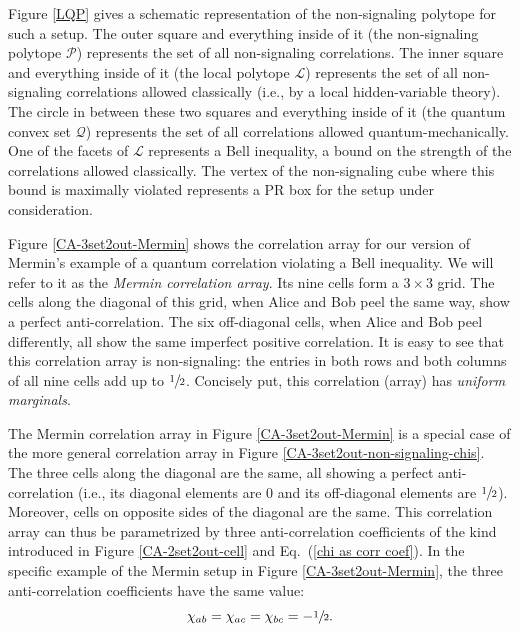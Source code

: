 Figure \ref{LQP} gives a schematic representation of the non-signaling polytope for such a setup. The outer square and everything inside of it (the non-signaling polytope $\mathcal{P}$) represents the set of all non-signaling correlations. The inner square and everything inside of it (the local polytope $\mathcal{L}$) represents the set of all non-signaling correlations allowed classically (i.e., by a local hidden-variable theory). The circle in between these two squares and everything inside of it (the quantum convex set $\mathcal{Q}$) represents the set of all correlations allowed quantum-mechanically. One of the facets of $\mathcal{L}$ represents a Bell inequality, a bound on the strength of the correlations allowed classically. The vertex of the non-signaling cube where this bound is maximally violated represents a PR box for the setup under consideration.

Figure \ref{CA-3set2out-Mermin} shows the correlation array for our version of Mermin's example of a quantum correlation violating a Bell inequality. We will refer to it as the \emph{Mermin correlation array}. Its nine cells form a $3 \times 3$ grid. The cells along the diagonal of this grid, when Alice and Bob peel the same way, show a perfect anti-correlation. The six off-diagonal cells, when Alice and Bob peel differently, all show the same imperfect positive correlation. It is easy to see that this correlation array is non-signaling: the entries in both rows and both columns of all nine cells add up to $\sfrac12$. Concisely put, this correlation (array) has \emph{uniform marginals}.

The Mermin correlation array in Figure \ref{CA-3set2out-Mermin} is a special case of the more general correlation array in Figure \ref{CA-3set2out-non-signaling-chis}. The three cells along the diagonal are the same, all showing a perfect anti-correlation (i.e., its diagonal elements are 0 and its off-diagonal elements are $\sfrac12$). Moreover, cells on opposite sides of the diagonal are the same. This correlation array can thus be parametrized by three anti-correlation coefficients of the kind introduced in Figure \ref{CA-2set2out-cell} and Eq.\ (\ref{chi as corr coef}).  In the specific example of the Mermin setup in Figure \ref{CA-3set2out-Mermin}, the three anti-correlation coefficients have the same value:  
\begin{equation}
\chi_{ab} = \chi_{ac} = \chi_{bc} = -\sfrac12.
\label{chi values Mermin example}
\end{equation}


